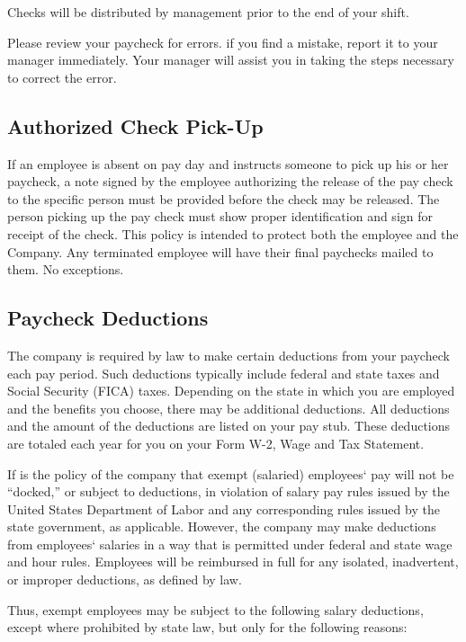 Checks will be distributed by management prior to the end of your shift.

Please review your paycheck for errors. if you find a mistake, report it to your manager immediately. Your manager will assist you in taking the steps necessary to correct the error.

\subsection{Authorized Check Pick-Up}

If an employee is absent on pay day and instructs someone to pick up his or her paycheck, a note signed by the employee authorizing the release of the pay check to the specific person must be provided before the check may be released. The person picking up the pay check must show proper identification and sign for receipt of the check. This policy is intended to protect both the employee and the Company. Any terminated employee will have their final paychecks mailed to them. No exceptions.

\subsection{Paycheck Deductions}

The company is required by law to make certain deductions from your paycheck each pay period. Such deductions typically include federal and state taxes and Social Security (FICA) taxes. Depending on the state in which you are employed and the benefits you choose, there may be additional deductions. All deductions and the amount of the deductions are listed on your pay stub. These deductions are totaled each year for you on your Form W-2, Wage and Tax Statement.

If is the policy of the company that exempt (salaried) employees‘ pay will not be “docked,” or subject to deductions, in violation of salary pay rules issued by the United States Department of Labor and any corresponding rules issued by the state government, as applicable. However, the company may make deductions from employees‘ salaries in a way that is permitted under federal and state wage and hour rules. Employees will be reimbursed in full for any isolated, inadvertent, or improper deductions, as defined by law.

Thus, exempt employees may be subject to the following salary deductions, except where prohibited by state law, but only for the following reasons:

